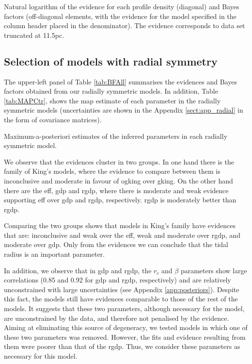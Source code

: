 \begin{table}
\tabcolsep=1pt
  \centering
  \caption[]{Natural logarithm of the evidence for each
        profile density (diagonal) and Bayes factors (off-diagonal
        elements, with the evidence for the model specified in the
        column header placed in the denominator). The evidence
        corresponds to data set truncated at 11.5pc.}  \label{tab:BFAll}
 \resizebox{\textwidth}{!}{
    
    }
  \end{table}

\subsection{Selection of models with radial symmetry} 

The upper-left panel of Table \ref{tab:BFAll} summarises the evidences and Bayes
factors obtained from our radially symmetric models. In addition, Table \ref{tab:MAPCtr}, shows the \gls{map}
 estimate of each parameter in the radially symmetric models
(uncertainties are shown in the Appendix \ref{sect:app_radial} in the form of covariance matrices).
 
   
 \begin{table}[ht!]
  \centering
      \caption[]{Maximum-a-posteriori estimates of the inferred parameters in each radially symmetric model.}
         \label{tab:MAPCtr}
         \resizebox{\textwidth}{!}{
         
         }
   \end{table}
 
We observe that the evidences cluster in two groups. In one hand there is the family of King's
models, where the evidence to compare between them is inconclusive and moderate in favour of \gls{ogking} over \gls{gking}. 
On the other hand there are the \gls{eff}, \gls{gdp} and \gls{rgdp}, where there is moderate and weak evidence
supporting \gls{eff} over \gls{gdp} and \gls{rgdp}, respectively. \gls{rgdp} is moderately better than \gls{rgdp}.

Comparing the two groups shows that models in King's family have evidences that are: inconclusive and weak
over the \gls{eff}, weak and moderate over  \gls{rgdp}, and moderate over \gls{gdp}. Only from the evidences we can conclude that
the tidal radius is an important parameter.

In addition, we observe that in \gls{gdp} and \gls{rgdp}, the $r_c$ and $\beta$ parameters  show large correlations (0.85 and 0.92 for \gls{gdp} and \gls{rgdp}, respectively) and are relatively unconstrained with large uncertainties (see Appendix \ref{app:posteriors}).
Despite this fact, the models still have evidences comparable to those of the rest of the models. It suggests that these two parameters, although necessary for the model, are unconstrained by the data, and therefore not penalised by the evidence. Aiming at eliminating this source of degeneracy,
 we tested models in which one of these two parameters was removed. However, the fits and evidence resulting from
them were poorer than that of the \gls{rgdp}. Thus, we consider these parameters as necessary for this model.

